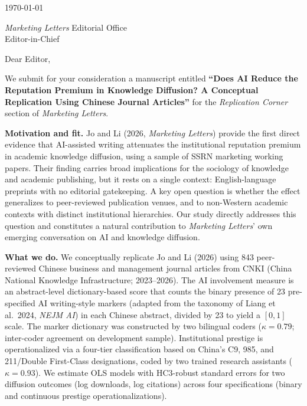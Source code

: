 \documentclass[12pt,a4paper]{article}
\begin{document}

\medskip

\noindent
\today

\bigskip

\noindent
\textit{Marketing Letters} Editorial Office\\
Editor-in-Chief

\bigskip

\noindent
Dear Editor,

\bigskip

We submit for your consideration a manuscript entitled \textbf{``Does AI
Reduce the Reputation Premium in Knowledge Diffusion? A Conceptual
Replication Using Chinese Journal Articles''} for the \textit{Replication
Corner} section of \textit{Marketing Letters}.

\medskip
\noindent\textbf{Motivation and fit.}
Jo and Li (2026, \textit{Marketing Letters}) provide the first direct
evidence that AI-assisted writing attenuates the institutional reputation
premium in academic knowledge diffusion, using a sample of SSRN marketing
working papers.
Their finding carries broad implications for the sociology of knowledge and
academic publishing, but it rests on a single context: English-language
preprints with no editorial gatekeeping.
A key open question is whether the effect generalizes to peer-reviewed
publication venues, and to non-Western academic contexts with distinct
institutional hierarchies.
Our study directly addresses this question and constitutes a natural
contribution to \textit{Marketing Letters}' own emerging conversation on AI
and knowledge diffusion.

\medskip
\noindent\textbf{What we do.}
We conceptually replicate Jo and Li (2026) using 843 peer-reviewed Chinese
business and management journal articles from CNKI (China National Knowledge
Infrastructure; 2023--2026).
The AI involvement measure is an abstract-level dictionary-based score that
counts the binary presence of 23 pre-specified AI writing-style markers
(adapted from the taxonomy of Liang et al.\ 2024, \textit{NEJM AI})
in each Chinese abstract, divided by 23 to yield a $[0,1]$ scale.
The marker dictionary was constructed by two bilingual coders
($\kappa = 0.79$; inter-coder agreement on development sample).
Institutional prestige is operationalized via a four-tier classification
based on China's C9, 985, and 211/Double First-Class designations,
coded by two trained research assistants ($\kappa = 0.93$).
We estimate OLS models with HC3-robust standard errors for two diffusion
outcomes (log downloads, log citations) across four specifications (binary
and continuous prestige operationalizations).
\end{document}
